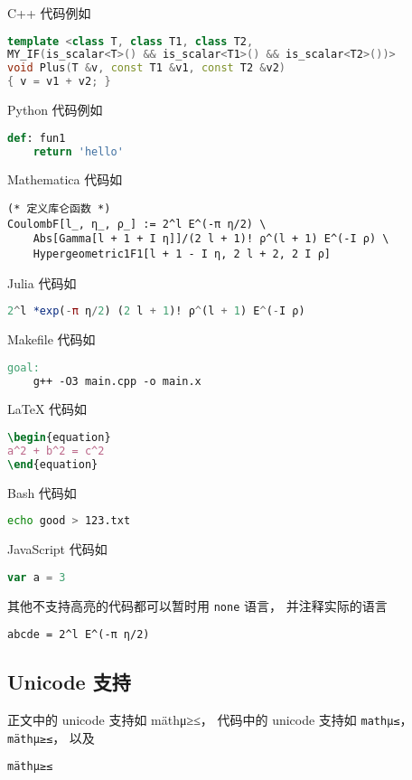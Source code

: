C++ 代码例如
\begin{lstlisting}[language=cpp]
template <class T, class T1, class T2,
MY_IF(is_scalar<T>() && is_scalar<T1>() && is_scalar<T2>())>
void Plus(T &v, const T1 &v1, const T2 &v2)
{ v = v1 + v2; }
\end{lstlisting}

Python 代码例如
\begin{lstlisting}[language=python]
def: fun1
	return 'hello'
\end{lstlisting}

Mathematica 代码如
\begin{lstlisting}[language=mma]
(* 定义库仑函数 *)
CoulombF[l_, η_, ρ_] := 2^l E^(-π η/2) \
    Abs[Gamma[l + 1 + I η]]/(2 l + 1)! ρ^(l + 1) E^(-I ρ) \
    Hypergeometric1F1[l + 1 - I η, 2 l + 2, 2 I ρ]
\end{lstlisting}

Julia 代码如
\begin{lstlisting}[language=julia]
2^l *exp(-π η/2) (2 l + 1)! ρ^(l + 1) E^(-I ρ)
\end{lstlisting}

Makefile 代码如
\begin{lstlisting}[language=Makefile]
goal:
    g++ -O3 main.cpp -o main.x
\end{lstlisting}

LaTeX 代码如
\begin{lstlisting}[language=latex]
\begin{equation}
a^2 + b^2 = c^2
\end{equation}
\end{lstlisting}

Bash 代码如
\begin{lstlisting}[language=bash]
echo good > 123.txt
\end{lstlisting}

JavaScript 代码如
\begin{lstlisting}[language=js]
var a = 3
\end{lstlisting}

其他不支持高亮的代码都可以暂时用 \verb|none| 语言， 并注释实际的语言
\begin{lstlisting}[language=none]
abcde = 2^l E^(-π η/2)
\end{lstlisting}

\subsection{Unicode 支持}
正文中的 unicode 支持如 mäthμ≥≤， 代码中的 unicode 支持如 \verb|mathμ≤|， \lstinline|mäthμ≥≤|， 以及
\begin{lstlisting}[language=none]
mäthμ≥≤
\end{lstlisting}

